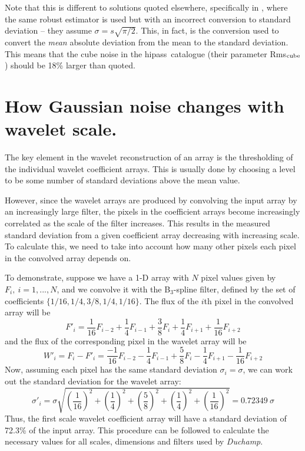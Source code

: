 \documentclass[12pt,a4paper]{article}
\newcommand{\hipass}{{\sc hipass}}
\newcommand{\duchamp}{\emph{Duchamp}}
\begin{document}
Note that this is different to solutions quoted elsewhere,
specifically in \citet{meyer04:trunc}, where the same robust estimator
is used but with an incorrect conversion to standard deviation -- they
assume $\sigma = s\sqrt{\pi/2}$. This, in fact, is the conversion used
to convert the \emph{mean} absolute deviation from the mean to the
standard deviation. This means that the cube noise in the \hipass\
catalogue (their parameter Rms$_{\rm cube}$) should be 18\% larger
than quoted.

\section{How Gaussian noise changes with wavelet scale.}
\label{app-scaling}

The key element in the wavelet reconstruction of an array is the
thresholding of the individual wavelet coefficient arrays. This is
usually done by choosing a level to be some number of standard
deviations above the mean value.

However, since the wavelet arrays are produced by convolving the input
array by an increasingly large filter, the pixels in the coefficient
arrays become increasingly correlated as the scale of the filter
increases. This results in the measured standard deviation from a
given coefficient array decreasing with increasing scale. To calculate
this, we need to take into account how many other pixels each pixel in
the convolved array depends on.

To demonstrate, suppose we have a 1-D array with $N$ pixel values
given by $F_i,\ i=1,...,N$, and we convolve it with the B$_3$-spline
filter, defined by the set of coefficients
$\{1/16,1/4,3/8,1/4,1/16\}$. The flux of the $i$th pixel in the
convolved array will be
\[
F'_i = \frac{1}{16}F_{i-2} + \frac{1}{4}F_{i-1} + \frac{3}{8}F_{i}
+ \frac{1}{4}F_{i+1} + \frac{1}{16}F_{i+2}
\]
and the flux of the corresponding pixel in the wavelet array will be 
\[
W'_i = F_i - F'_i = \frac{-1}{16}F_{i-2} - \frac{1}{4}F_{i-1} + \frac{5}{8}F_{i}
- \frac{1}{4}F_{i+1} - \frac{1}{16}F_{i+2}
\]
Now, assuming each pixel has the same standard deviation
$\sigma_i=\sigma$, we can work out the standard deviation for the
wavelet array:
\[
\sigma'_i = \sigma \sqrt{\left(\frac{1}{16}\right)^2 + \left(\frac{1}{4}\right)^2
  + \left(\frac{5}{8}\right)^2 + \left(\frac{1}{4}\right)^2 + \left(\frac{1}{16}\right)^2}
          = 0.72349\ \sigma
\]
Thus, the first scale wavelet coefficient array will have a standard
deviation of 72.3\% of the input array. This procedure can be followed
to calculate the necessary values for all scales, dimensions and
filters used by \duchamp.
\end{document}
